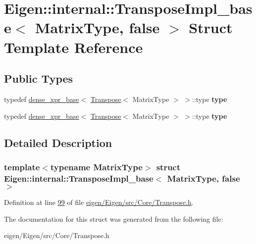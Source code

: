 \hypertarget{struct_eigen_1_1internal_1_1_transpose_impl__base_3_01_matrix_type_00_01false_01_4}{}\section{Eigen\+:\+:internal\+:\+:Transpose\+Impl\+\_\+base$<$ Matrix\+Type, false $>$ Struct Template Reference}
\label{struct_eigen_1_1internal_1_1_transpose_impl__base_3_01_matrix_type_00_01false_01_4}
\subsection*{Public Types}
\begin{DoxyCompactItemize}
\item 
\mbox{\label{struct_eigen_1_1internal_1_1_transpose_impl__base_3_01_matrix_type_00_01false_01_4_a613729dc09e3c791cf56e0c523637209}} 
typedef \hyperlink{struct_eigen_1_1internal_1_1dense__xpr__base}{dense\+\_\+xpr\+\_\+base}$<$ \hyperlink{group___core___module_class_eigen_1_1_transpose}{Transpose}$<$ Matrix\+Type $>$ $>$\+::type {\bfseries type}
\item 
\mbox{\label{struct_eigen_1_1internal_1_1_transpose_impl__base_3_01_matrix_type_00_01false_01_4_a613729dc09e3c791cf56e0c523637209}} 
typedef \hyperlink{struct_eigen_1_1internal_1_1dense__xpr__base}{dense\+\_\+xpr\+\_\+base}$<$ \hyperlink{group___core___module_class_eigen_1_1_transpose}{Transpose}$<$ Matrix\+Type $>$ $>$\+::type {\bfseries type}
\end{DoxyCompactItemize}


\subsection{Detailed Description}
\subsubsection*{template$<$typename Matrix\+Type$>$\newline
struct Eigen\+::internal\+::\+Transpose\+Impl\+\_\+base$<$ Matrix\+Type, false $>$}



Definition at line \hyperlink{eigen_2_eigen_2src_2_core_2_transpose_8h_source_l00099}{99} of file \hyperlink{eigen_2_eigen_2src_2_core_2_transpose_8h_source}{eigen/\+Eigen/src/\+Core/\+Transpose.\+h}.



The documentation for this struct was generated from the following file\+:\begin{DoxyCompactItemize}
\item 
eigen/\+Eigen/src/\+Core/\+Transpose.\+h\end{DoxyCompactItemize}
